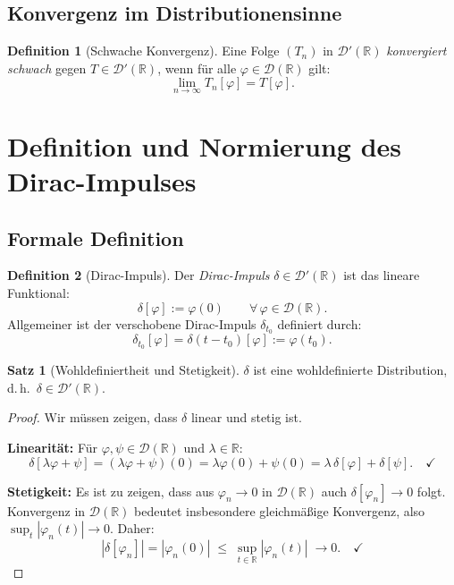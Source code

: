 ﻿\documentclass[a4paper,12pt]{article}
\theoremstyle{definition}
\newtheorem{definition}{Definition}
\newtheorem{satz}{Satz}
\begin{document}
\subsection{Konvergenz im Distributionensinne}

\begin{definition}[Schwache Konvergenz]
Eine Folge $(T_n)$ in $\mathcal{D}'(\mathbb{R})$ \emph{konvergiert schwach} gegen $T \in \mathcal{D}'(\mathbb{R})$,
wenn f\"ur alle $\varphi \in \mathcal{D}(\mathbb{R})$ gilt:
\[
\lim_{n \to \infty} T_n[\varphi] = T[\varphi].
\]
\end{definition}

\section{Definition und Normierung des Dirac-Impulses}
\label{sec:definition}

\subsection{Formale Definition}

\begin{definition}[Dirac-Impuls]
\label{def:dirac}
Der \emph{Dirac-Impuls} $\delta \in \mathcal{D}'(\mathbb{R})$ ist das lineare Funktional:
\[
\delta[\varphi] := \varphi(0)
\qquad \forall\, \varphi \in \mathcal{D}(\mathbb{R}).
\]
Allgemeiner ist der verschobene Dirac-Impuls $\delta_{t_0}$ definiert durch:
\[
\delta_{t_0}[\varphi] = \delta(t - t_0)[\varphi] := \varphi(t_0).
\]
\end{definition}

\begin{satz}[Wohldefiniertheit und Stetigkeit]
\label{satz:stetigkeit}
$\delta$ ist eine wohldefinierte Distribution, d.\,h.\ $\delta \in \mathcal{D}'(\mathbb{R})$.
\end{satz}

\begin{proof}
Wir m\"ussen zeigen, dass $\delta$ linear und stetig ist.

\textbf{Linearit\"at:} F\"ur $\varphi, \psi \in \mathcal{D}(\mathbb{R})$ und $\lambda \in \mathbb{R}$:
\[
\delta[\lambda\varphi + \psi] = (\lambda\varphi + \psi)(0) = \lambda\varphi(0) + \psi(0)
= \lambda\,\delta[\varphi] + \delta[\psi]. \quad \checkmark
\]

\textbf{Stetigkeit:} Es ist zu zeigen, dass aus $\varphi_n \to 0$ in $\mathcal{D}(\mathbb{R})$
auch $\delta[\varphi_n] \to 0$ folgt. Konvergenz in $\mathcal{D}(\mathbb{R})$ bedeutet insbesondere
gleichm\"a{\ss}ige Konvergenz, also $\sup_t |\varphi_n(t)| \to 0$. Daher:
\[
|\delta[\varphi_n]| = |\varphi_n(0)| \;\leq\; \sup_{t \in \mathbb{R}} |\varphi_n(t)| \;\to 0. \quad \checkmark
\]
\end{proof}
\end{document}
